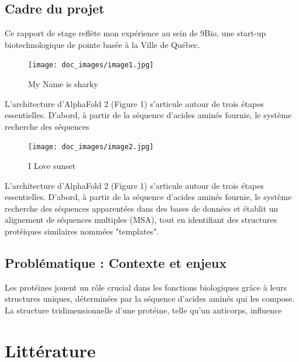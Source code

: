 \documentclass{article}
\begin{document}
\subsection{Cadre du projet}
Ce rapport de stage reflète mon expérience au sein de 9Bio, une start-up biotechnologique de pointe basée à la Ville de Québec.\begin{figure}[H]
\centering
\texttt{[image: doc\_images/image1.jpg]}
\caption{\label{My_Name_is_sharky} My Name is sharky}\end{figure}L’architecture d’AlphaFold 2 (Figure 1) s’articule autour de trois étapes essentielles. D’abord, à partir de la séquence d’acides aminés fournie, le système recherche des séquences\begin{figure}[H]
\centering
\texttt{[image: doc\_images/image2.jpg]}
\caption{\label{I_Love_sunset} I Love sunset}\end{figure}L’architecture d’AlphaFold 2 (Figure 1) s’articule autour de trois étapes essentielles. D’abord, à partir de la séquence d’acides aminés fournie, le système recherche des séquences apparentées dans des bases de données et établit un alignement de séquences multiples (MSA), tout en identifiant des structures protéiques similaires nommées "templates".
\subsection{Problématique : Contexte et enjeux}
Les protéines jouent un rôle crucial dans les fonctions biologiques grâce à leurs structures uniques, déterminées par la séquence d’acides aminés qui les compose. La structure tridimensionnelle d’une protéine, telle qu’un anticorps, influence
\section{Littérature}
\end{document}
